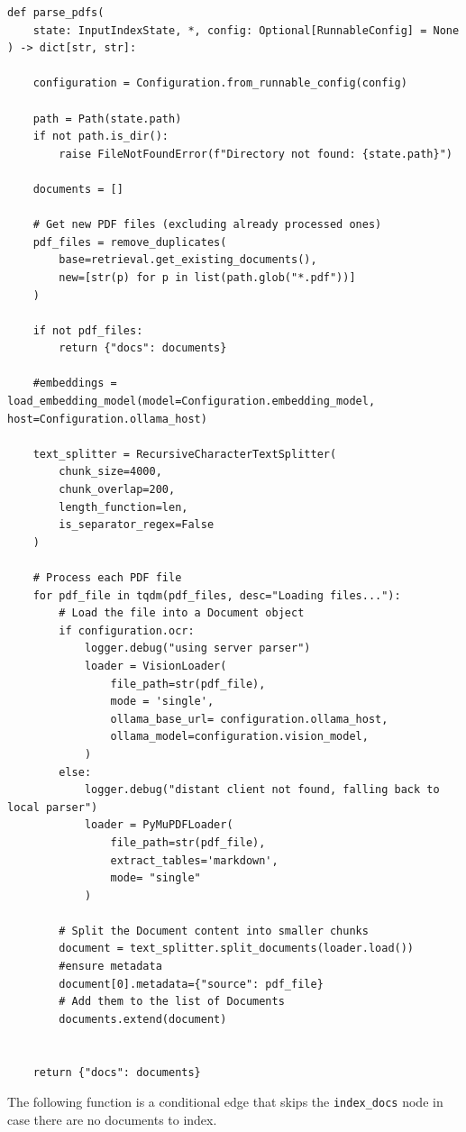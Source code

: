 \documentclass[11pt,a4paper]{report}
\begin{document}
\begin{lstlisting}[caption={Parse pdf node}]
def parse_pdfs(
    state: InputIndexState, *, config: Optional[RunnableConfig] = None
) -> dict[str, str]:

    configuration = Configuration.from_runnable_config(config)
    
    path = Path(state.path)
    if not path.is_dir():
        raise FileNotFoundError(f"Directory not found: {state.path}")

    documents = []
    
    # Get new PDF files (excluding already processed ones)
    pdf_files = remove_duplicates(
        base=retrieval.get_existing_documents(),
        new=[str(p) for p in list(path.glob("*.pdf"))]
    )
    
    if not pdf_files:
        return {"docs": documents}
    
    #embeddings = load_embedding_model(model=Configuration.embedding_model, host=Configuration.ollama_host)

    text_splitter = RecursiveCharacterTextSplitter(
        chunk_size=4000,
        chunk_overlap=200,
        length_function=len,
        is_separator_regex=False
    )

    # Process each PDF file
    for pdf_file in tqdm(pdf_files, desc="Loading files..."):                
        # Load the file into a Document object
        if configuration.ocr:
            logger.debug("using server parser")
            loader = VisionLoader(
                file_path=str(pdf_file),
                mode = 'single',
                ollama_base_url= configuration.ollama_host,
                ollama_model=configuration.vision_model,
            )
        else:
            logger.debug("distant client not found, falling back to local parser")
            loader = PyMuPDFLoader(
                file_path=str(pdf_file),
                extract_tables='markdown',
                mode= "single"
            )
        
        # Split the Document content into smaller chunks
        document = text_splitter.split_documents(loader.load())
        #ensure metadata
        document[0].metadata={"source": pdf_file}
        # Add them to the list of Documents
        documents.extend(document)


    return {"docs": documents}
\end{lstlisting}

The following function is a conditional edge that skips the \texttt{index\_docs} node in case there are no documents to index.
\end{document}
